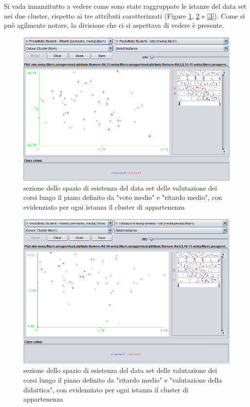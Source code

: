         Si vada innanzitutto a vedere come sono state raggruppate le istanze del data set nei due cluster, rispetto ai tre attributi caratterizzati (Figure \ref{1}, \ref{2} e \ref{3}). Come si può agilmente notare, la divisione che ci si aspettava di vedere è presente.\\

        \begin{figure}
            \centering
            \caption{sezione dello spazio di esistenza del data set delle valutazione dei corsi lungo il piano definito da "voto medio" e "ritardo medio", con evidenziato per ogni istanza il cluster di appartenenza}
            \label{1}
            \includegraphics[scale=0.5]{../cluster/min_kmeans_2cl_attr1.png}
        \end{figure}

        \begin{figure}
            \centering
            \caption{sezione dello spazio di esistenza del data set delle valutazione dei corsi lungo il piano definito da "ritardo medio" e "valutazione della didattica", con evidenziato per ogni istanza il cluster di appartenenza}
            \label{2}
            \includegraphics[scale=0.5]{../cluster/min_kmeans_2cl_attr2.png}
        \end{figure}

